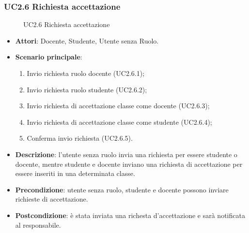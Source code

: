 \subsubsection{UC2.6 Richiesta accettazione}
\begin{figure}[H]
\centering
\noindent{}
\caption{UC2.6 Richiesta accettazione}
\end{figure}
\begin{itemize}
\item \textbf{Attori}: Docente, Studente, Utente senza Ruolo.
\item \textbf{Scenario principale}:
\begin{enumerate}
\item Invio richiesta ruolo docente (UC2.6.1);
\item Invio richiesta ruolo studente (UC2.6.2);
\item Invio richiesta di accettazione classe come docente (UC2.6.3);
\item Invio richiesta di accettazione classe come studente (UC2.6.4);
\item Conferma invio richiesta (UC2.6.5).
\end{enumerate}
\item \textbf{Descrizione}: l'utente senza ruolo invia una richiesta per essere studente o docente, mentre studente e docente inviano una richiesta di accettazione per essere inseriti in una determinata classe.
\item \textbf{Precondizione}: utente senza ruolo, studente e docente possono inviare richieste di accettazione.
\item \textbf{Postcondizione}: è stata inviata una richesta d'accettazione e sarà notificata al responsabile.
\end{itemize}
